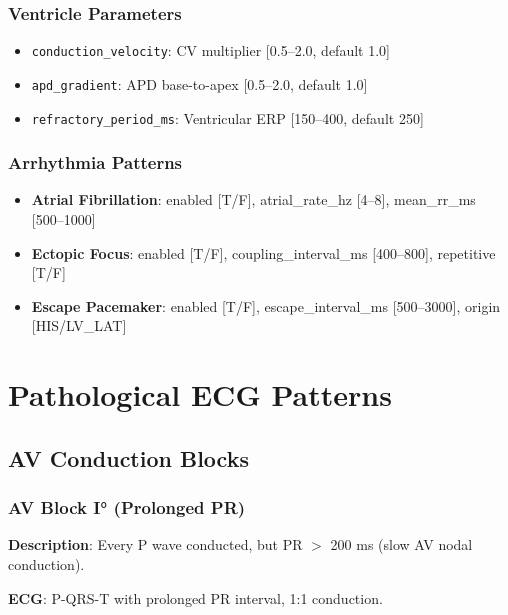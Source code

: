 \documentclass[12pt,oneside,a4paper]{book}
\newcommand{\code}[1]{\texttt{#1}}
\begin{document}
\subsection{Ventricle Parameters}
\begin{itemize}
  \item \code{conduction\_velocity}: CV multiplier [0.5--2.0, default 1.0]
  \item \code{apd\_gradient}: APD base-to-apex [0.5--2.0, default 1.0]
  \item \code{refractory\_period\_ms}: Ventricular ERP [150--400, default 250]
\end{itemize}

\subsection{Arrhythmia Patterns}
\begin{itemize}
  \item \textbf{Atrial Fibrillation}: enabled [T/F], atrial\_rate\_hz [4--8], mean\_rr\_ms [500--1000]
  \item \textbf{Ectopic Focus}: enabled [T/F], coupling\_interval\_ms [400--800], repetitive [T/F]
  \item \textbf{Escape Pacemaker}: enabled [T/F], escape\_interval\_ms [500--3000], origin [HIS/LV\_LAT]
\end{itemize}


\chapter{Pathological ECG Patterns}

\section{AV Conduction Blocks}

\subsection{AV Block I° (Prolonged PR)}

\textbf{Description}: Every P wave conducted, but PR $>$ 200 ms (slow AV nodal conduction).

\textbf{ECG}: P-QRS-T with prolonged PR interval, 1:1 conduction.
\end{document}
